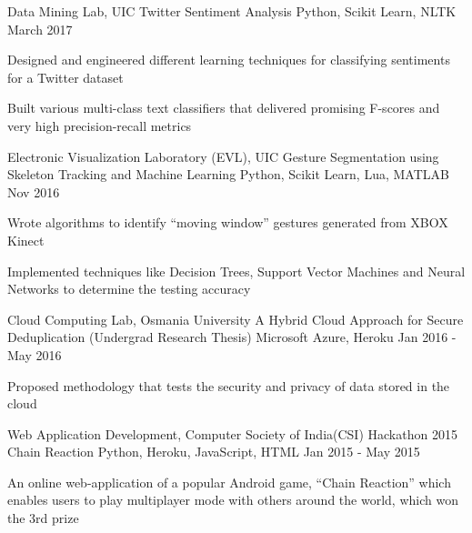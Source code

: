 \begin{cventries}
  \cventry
    {Data Mining Lab, UIC}
    {Twitter Sentiment Analysis}
    {Python, Scikit Learn, NLTK}
    {March 2017}
    {
      \begin{cvitems}
        \item {Designed and engineered different learning techniques for classifying sentiments for a Twitter dataset}
        \item{Built various multi-class text classifiers that delivered promising F-scores and very high precision-recall metrics}
      \end{cvitems}
    }
  \cventry
    {Electronic Visualization Laboratory (EVL), UIC}
    {Gesture Segmentation using Skeleton Tracking and Machine Learning}
    {Python, Scikit Learn, Lua, MATLAB}
    {Nov 2016}
    {
      \begin{cvitems}
        \item {Wrote algorithms to identify “moving window” gestures generated from XBOX Kinect}
        \item{Implemented techniques like Decision Trees, Support Vector Machines and Neural Networks to determine the testing accuracy}
      \end{cvitems}
    }
  \cventry
    {Cloud Computing Lab, Osmania University}
    {A Hybrid Cloud Approach for Secure Deduplication (Undergrad Research Thesis)}
    {Microsoft Azure, Heroku}
    {Jan 2016 - May 2016}
    {
      \begin{cvitems}
        \item {Proposed methodology that tests the security and privacy of data stored in the cloud}
      \end{cvitems}
    }
  \cventry
    {Web Application Development, Computer Society of India(CSI) Hackathon 2015}
    {Chain Reaction}
    {Python, Heroku, JavaScript, HTML}
    {Jan 2015 - May 2015}
    {
      \begin{cvitems}
        \item {An online web-application of a popular Android game, “Chain Reaction” which enables users to play multiplayer mode with others around the world, which won the 3rd prize}
      \end{cvitems}
    }
\end{cventries}
